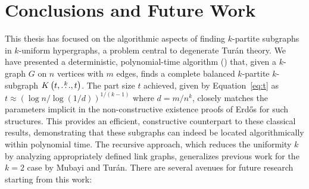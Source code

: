 \section{Conclusions and Future Work}\label{sec:conclusions}

This thesis has focused on the algorithmic aspects of finding $k$-partite subgraphs in $k$-uniform hypergraphs,
a problem central to degenerate Turán theory.
We have presented a deterministic,
polynomial-time algorithm () that, given a $k$-graph $G$ on $n$ vertices with $m$ edges,
finds a complete balanced $k$-partite $k$-subgraph $K\left(t, \overset{k}{\dots}, t\right)$.
The part size $t$ achieved, given by Equation~\eqref{eq:t} as $t \approx (\log n / \log(1/d))^{1/(k-1)}$ where $d=m/n^k$,
closely matches the parameters implicit in the non-constructive existence proofs of Erd\H{o}s for such structures.
This provides an efficient, constructive counterpart to these classical results,
demonstrating that these subgraphs can indeed be located algorithmically within polynomial time.
The recursive approach, which reduces the uniformity $k$ by analyzing appropriately defined link graphs,
generalizes previous work for the $k=2$
case by Mubayi and Turán.
There are several avenues for future research starting from this work:

